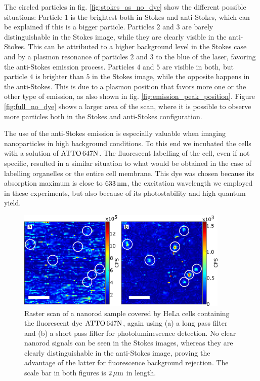 The circled particles in fig. \ref{fig:stokes_as_no_dye} show the different
possible situations: Particle $1$ is the brightest both in Stokes and
anti-Stokes, which can be explained if this is a bigger particle.
Particles $2$ and $3$ are barely distinguishable in the Stokes image, while they
are clearly visible in the anti-Stokes. This can be attributed to a higher
background level in the Stokes case and by a plasmon resonance of particles $2$
and $3$ to the blue of the laser, favoring the anti-Stokes emission process.
Particles $4$ and $5$ are visible in both, but particle $4$ is brighter than $5$
in the Stokes image, while the opposite happens in the anti-Stokes.
This is due to a plasmon position that favors more one or the other type of
emission, as also shown in fig. \ref{fig:emission_peak_position}. Figure
\ref{fig:full_no_dye} shows a larger area of the scan, where it is possible to
observe more particles both in the Stokes and anti-Stokes configuration.

The use of the anti-Stokes emission is especially valuable when imaging
nanoparticles in high background conditions. To this end we incubated the cells
with a solution of $\textrm{ATTO}\,647\textrm{N}$. The fluorescent labelling of the cell, even if not
specific, resulted in a similar situation to what would be obtained in the case
of labelling organelles or the entire cell membrane. This dye was chosen because
its absorption maximum is close to $633\,\textrm{nm}$, the excitation wavelength we
employed in these experiments, but also because of its photostability and high
quantum yield.

\begin{figure}[htp] \centering
\includegraphics[width=0.9\textwidth]{Chapters/03_Background_Free/Figures/05_Stokes_AS_with_dye/stokes_as_with_dye.png}
\caption{Raster scan of a nanorod sample covered by HeLa cells containing the
fluorescent dye $\textrm{ATTO}\,647\textrm{N}$, again using (a) a long pass filter and (b) a short pass
filter for photoluminescence detection. No clear nanorod signals can be seen in
the Stokes images, whereas they are clearly distinguishable in the anti-Stokes
image, proving the advantage of the latter for fluorescence background
rejection. The scale bar in both figures is $2\,\mu\textrm{m}$ in length.}
	\label{fig:Stokes_AS_with_dye}
\end{figure}


